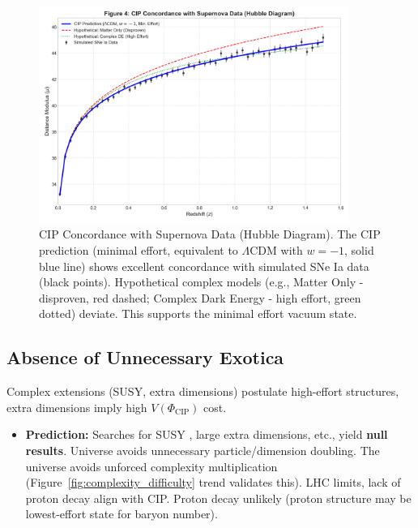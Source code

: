 \documentclass[11pt, a4paper]{article}
\newcommand{\subt}[1]{\mathrm{#1}}
\begin{document}
\begin{figure}[H]
    \centering
    \includegraphics[width=0.9\textwidth]{CIP_Supernova.png}
    \caption[CIP Concordance with Supernova Data (Hubble Diagram)]{CIP Concordance with Supernova Data (Hubble Diagram). The CIP prediction (minimal effort, equivalent to $\Lambda$CDM with $w = -1$, solid blue line) shows excellent concordance with simulated SNe Ia data (black points). Hypothetical complex models (e.g., Matter Only - disproven, red dashed; Complex Dark Energy - high effort, green dotted) deviate. This supports the minimal effort vacuum state.}
    \label{fig:supernova}
\end{figure}


\subsection{Absence of Unnecessary Exotica} \label{sec:pred_exotica}
Complex extensions (SUSY, extra dimensions) postulate high-effort structures, extra dimensions imply high $V(\Phi_{\subt{CIP}})$ cost.
\begin{itemize}
    \item \textbf{Prediction:} Searches for SUSY \cite{SupersymmetrySearches}, large extra dimensions, etc., yield \textbf{null results}. Universe avoids unnecessary particle/dimension doubling. The universe avoids unforced complexity multiplication (Figure~\ref{fig:complexity_difficulty} trend validates this). LHC limits, lack of proton decay align with CIP. Proton decay unlikely (proton structure may be lowest-effort state for baryon number).
\end{itemize}
\end{document}
